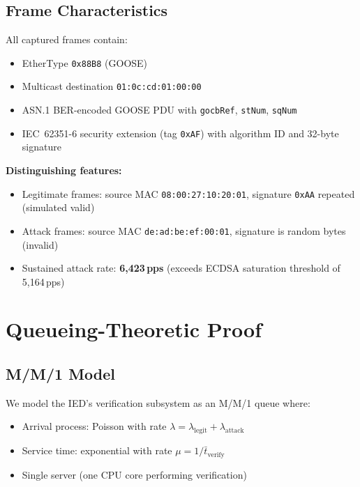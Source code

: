 \documentclass[11pt,a4paper]{article}
\begin{document}
\subsection{Frame Characteristics}

All captured frames contain:
\begin{itemize}[leftmargin=2em]
    \item EtherType \texttt{0x88B8} (GOOSE)
    \item Multicast destination \texttt{01:0c:cd:01:00:00}
    \item ASN.1 BER-encoded GOOSE PDU with \texttt{gocbRef}, \texttt{stNum}, \texttt{sqNum}
    \item IEC~62351-6 security extension (tag \texttt{0xAF}) with algorithm ID and 32-byte signature
\end{itemize}

\textbf{Distinguishing features:}
\begin{itemize}[leftmargin=2em]
    \item Legitimate frames: source MAC \texttt{08:00:27:10:20:01}, signature \texttt{0xAA} repeated (simulated valid)
    \item Attack frames: source MAC \texttt{de:ad:be:ef:00:01}, signature is random bytes (invalid)
    \item Sustained attack rate: \textbf{6{,}423\,pps} (exceeds ECDSA saturation threshold of 5{,}164\,pps)
\end{itemize}

\section{Queueing-Theoretic Proof}
\label{sec:queueing}

\subsection{M/M/1 Model}

We model the IED's verification subsystem as an M/M/1 queue where:
\begin{itemize}[leftmargin=2em]
    \item Arrival process: Poisson with rate $\lambda = \lambda_{\text{legit}} + \lambda_{\text{attack}}$
    \item Service time: exponential with rate $\mu = 1/\bar{t}_{\text{verify}}$
    \item Single server (one CPU core performing verification)
\end{itemize}
\end{document}
